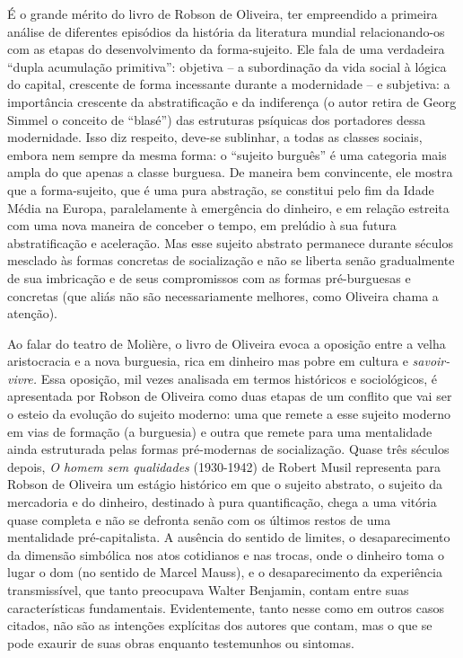 É o grande mérito do livro de Robson de Oliveira, ter empreendido a
primeira análise de diferentes episódios da história da literatura
mundial relacionando-os com as etapas do desenvolvimento da
forma-sujeito. Ele fala de uma verdadeira ``dupla acumulação
primitiva'': objetiva -- a subordinação da vida social à lógica do
capital, crescente de forma incessante durante a modernidade -- e
subjetiva: a importância crescente da abstratificação e da indiferença
(o autor retira de Georg Simmel o conceito de ``blasé'') das estruturas
psíquicas dos portadores dessa modernidade. Isso diz respeito, deve-se
sublinhar, a todas as classes sociais, embora nem sempre da mesma forma:
o ``sujeito burguês'' é uma categoria mais ampla do que apenas a classe
burguesa. De maneira bem convincente, ele mostra que a forma-sujeito,
que é uma pura abstração, se constitui pelo fim da Idade Média na
Europa, paralelamente à emergência do dinheiro, e em relação estreita
com uma nova maneira de conceber o tempo, em prelúdio à sua futura
abstratificação e aceleração. Mas esse sujeito abstrato permanece
durante séculos mesclado às formas concretas de socialização e não se
liberta senão gradualmente de sua imbricação e de seus compromissos com
as formas pré-burguesas e concretas (que aliás não são necessariamente
melhores, como Oliveira chama a atenção).

Ao falar do teatro de Molière, o livro de Oliveira evoca a oposição
entre a velha aristocracia e a nova burguesia, rica em dinheiro mas
pobre em cultura e \emph{savoir-vivre.} Essa oposição, mil vezes
analisada em termos históricos e sociológicos, é apresentada por Robson
de Oliveira como duas etapas de um conflito que vai ser o esteio da
evolução do sujeito moderno: uma que remete a esse sujeito moderno em
vias de formação (a burguesia) e outra que remete para uma mentalidade
ainda estruturada pelas formas pré-modernas de socialização. Quase três
séculos depois, \emph{O homem sem qualidades} (1930-1942) de Robert
Musil representa para Robson de Oliveira um estágio histórico em que o
sujeito abstrato, o sujeito da mercadoria e do dinheiro, destinado à
pura quantificação, chega a uma vitória quase completa e não se defronta
senão com os últimos restos de uma mentalidade pré-capitalista. A
ausência do sentido de limites, o desaparecimento da dimensão simbólica
nos atos cotidianos e nas trocas, onde o dinheiro toma o lugar o dom (no
sentido de Marcel Mauss), e o desaparecimento da experiência
transmissível, que tanto preocupava Walter Benjamin, contam entre suas
características fundamentais. Evidentemente, tanto nesse como em outros
casos citados, não são as intenções explícitas dos autores que contam,
mas o que se pode exaurir de suas obras enquanto testemunhos ou
sintomas.

